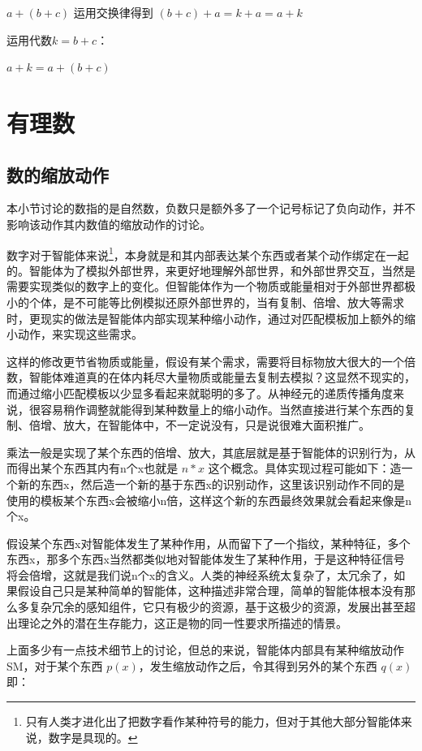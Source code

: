 \documentclass[12pt,oneside]{book}
\begin{document}
$a+ (b + c)$ 运用交换律得到 $(b+c) +a = k+a = a+k$

运用代数$k=b+c$：

$a+k = a+ (b+c)$




\chapter{有理数}
\section{数的缩放动作}
本小节讨论的数指的是自然数，负数只是额外多了一个记号标记了负向动作，并不影响该动作其内数值的缩放动作的讨论。

数字对于智能体来说\footnote{只有人类才进化出了把数字看作某种符号的能力，但对于其他大部分智能体来说，数字是具现的。}，本身就是和其内部表达某个东西或者某个动作绑定在一起的。智能体为了模拟外部世界，来更好地理解外部世界，和外部世界交互，当然是需要实现类似的数字上的变化。但智能体作为一个物质或能量相对于外部世界都极小的个体，是不可能等比例模拟还原外部世界的，当有复制、倍增、放大等需求时，更现实的做法是智能体内部实现某种缩小动作，通过对匹配模板加上额外的缩小动作，来实现这些需求。

这样的修改更节省物质或能量，假设有某个需求，需要将目标物放大很大的一个倍数，智能体难道真的在体内耗尽大量物质或能量去复制去模拟？这显然不现实的，而通过缩小匹配模板以少显多看起来就聪明的多了。从神经元的递质传播角度来说，很容易稍作调整就能得到某种数量上的缩小动作。当然直接进行某个东西的复制、倍增、放大，在智能体中，不一定说没有，只是说很难大面积推广。

乘法一般是实现了某个东西的倍增、放大，其底层就是基于智能体的识别行为，从而得出某个东西其内有n个x也就是 $n*x$ 这个概念。具体实现过程可能如下：造一个新的东西x，然后造一个新的基于东西x的识别动作，这里该识别动作不同的是使用的模板某个东西x会被缩小n倍，这样这个新的东西最终效果就会看起来像是n个x。

假设某个东西x对智能体发生了某种作用，从而留下了一个指纹，某种特征，多个东西x，那多个东西x当然都类似地对智能体发生了某种作用，于是这种特征信号将会倍增，这就是我们说n个x的含义。人类的神经系统太复杂了，太冗余了，如果假设自己只是某种简单的智能体，这种描述非常合理，简单的智能体根本没有那么多复杂冗余的感知组件，它只有极少的资源，基于这极少的资源，发展出甚至超出理论之外的潜在生存能力，这正是物的同一性要求所描述的情景。

上面多少有一点技术细节上的讨论，但总的来说，智能体内部具有某种缩放动作SM，对于某个东西 $p(x)$，发生缩放动作之后，令其得到另外的某个东西 $q(x)$ 即：
\end{document}

